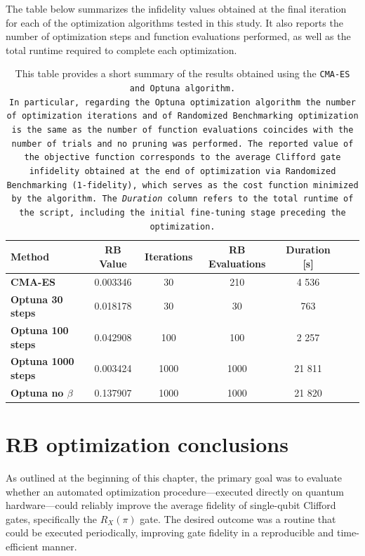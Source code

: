 The table below summarizes the infidelity values obtained at the final iteration for each of the optimization algorithms tested in this study. 
It also reports the number of optimization steps and function evaluations performed, as well as the total runtime required to complete each optimization.

\begin{table}[h]
    \centering
    \begin{tabular}{lcccccc}
        \toprule
        \textbf{Method} & \textbf{RB Value} & \textbf{Iterations} & \textbf{RB Evaluations} & \textbf{Duration [s]}\\
        \midrule
        \textbf{CMA-ES} & 0.003346 & 30 & 210 & 4 536 \\
        \textbf{Optuna 30 steps} & 0.018178  & 30 & 30 & 763\\
        \textbf{Optuna 100 steps} & 0.042908 & 100 & 100 & 2 257\\
        \textbf{Optuna 1000 steps} & 0.003424 & 1000 & 1000 & 21 811\\
        \textbf{Optuna no $\beta$} & 0.137907 & 1000 & 1000 & 21 820\\
        \bottomrule
    \end{tabular}
    \caption{This table provides a short summary of the results obtained using the \tt{CMA-ES} and \tt{Optuna} algorithm.\\ 
    In particular, regarding the \tt{Optuna} optimization algorithm the number of optimization iterations and of Randomized Benchmarking optimization is the same as the number of function evaluations coincides with the number of trials and no pruning was performed.
    The reported value of the objective function corresponds to the average Clifford gate infidelity obtained at the end of optimization via Randomized Benchmarking (1-fidelity), which serves as the cost function minimized by the algorithm.
    The \textit{Duration} column refers to the total runtime of the script, including the initial fine-tuning stage preceding the optimization.\\}
    \label{tab:optuna_opt}
\end{table}

\section{RB optimization conclusions}

As outlined at the beginning of this chapter, the primary goal was to evaluate whether an automated optimization procedure—executed directly on quantum hardware—could reliably improve the average fidelity of single-qubit Clifford gates, specifically the $R_X(\pi)$ gate. 
The desired outcome was a routine that could be executed periodically, improving gate fidelity in a reproducible and time-efficient manner.

